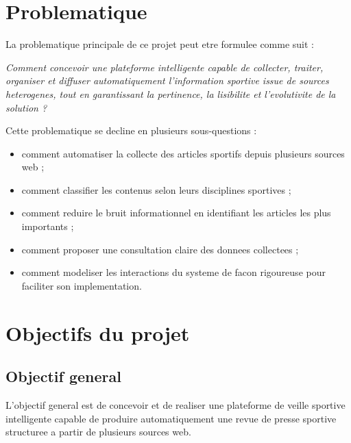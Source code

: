 \documentclass[12pt,a4paper,oneside]{report}
\begin{document}
\section{Problematique}
La problematique principale de ce projet peut etre formulee comme suit :

\textit{Comment concevoir une plateforme intelligente capable de collecter, traiter, organiser et diffuser automatiquement l'information sportive issue de sources heterogenes, tout en garantissant la pertinence, la lisibilite et l'evolutivite de la solution ?}

Cette problematique se decline en plusieurs sous-questions :
\begin{itemize}
\item comment automatiser la collecte des articles sportifs depuis plusieurs sources web ;
\item comment classifier les contenus selon leurs disciplines sportives ;
\item comment reduire le bruit informationnel en identifiant les articles les plus importants ;
\item comment proposer une consultation claire des donnees collectees ;
\item comment modeliser les interactions du systeme de facon rigoureuse pour faciliter son implementation.
\end{itemize}

\section{Objectifs du projet}
\subsection{Objectif general}
L'objectif general est de concevoir et de realiser une plateforme de veille sportive intelligente capable de produire automatiquement une revue de presse sportive structuree a partir de plusieurs sources web.
\end{document}
